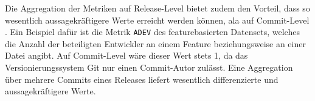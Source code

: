 Die Aggregation der Metriken auf Release-Level bietet zudem den Vorteil, dass so wesentlich aussagekräftigere Werte erreicht werden können, ala auf Commit-Level \cite{Zimmermann2007}. Ein Beispiel dafür ist die Metrik \texttt{ADEV} des featurebasierten Datensets, welches die Anzahl der beteiligten Entwickler an einem Feature beziehungsweise an einer Datei angibt. Auf Commit-Level wäre dieser Wert stets 1, da das Versionierungssystem Git nur einen Commit-Autor zulässt. Eine Aggregation über mehrere Commits eines Releases liefert wesentlich differenzierte und aussagekräftigere Werte.

\cleardoublepage